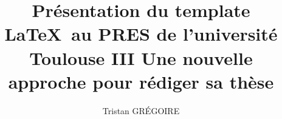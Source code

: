 \documentclass{book}
\title{\textbf{\large Pr\'esentation du template \LaTeX\ au PRES de l'universit\'e Toulouse III Une nouvelle approche pour r\'ediger sa th\`ese}}
\author{Tristan GR\'EGOIRE}
\begin{document}
    \makeflyleaf
\end{document}
